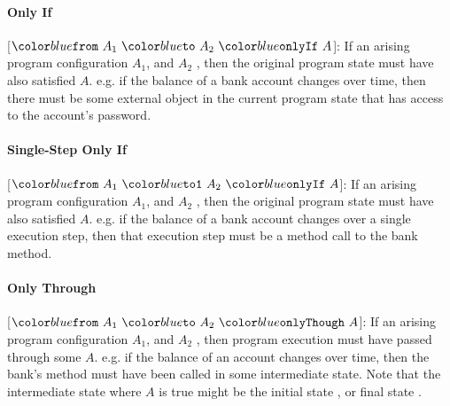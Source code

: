 \paragraph{Only If}
[$\onlyIf{A_1}{A_2}{A}$]: If an arising program configuration  $A_1$, and  $A_2$ , 
then the original program state must have also satisfied $A$.
e.g. if the balance of a bank account changes over time, then there must be some external object in the current 
program state that has access to the account's password.

\paragraph{Single-Step Only If}
[$\onlyIfSingle{A_1}{A_2}{A}$]: If an arising program configuration  $A_1$, and  $A_2$ , 
then the original program state must have also satisfied $A$.
e.g. if the balance of a bank account changes over a single execution step, then that execution step must be a method call to the bank  method.

\paragraph{Only Through}
[$\onlyThrough{A_1}{A_2}{A}$]: If an arising program configuration  $A_1$, and  $A_2$ , then program execution must have passed through some  $A$.
e.g. if the balance of an account changes over time, then the bank's  method must have been called 
in some intermediate state. Note 
that the intermediate state where $A$ is true might be the initial state ,
or final state . 



